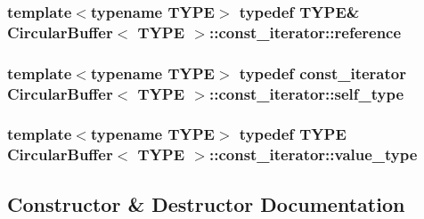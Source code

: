\subsubsection[{\texorpdfstring{reference}{reference}}]{\setlength{\rightskip}{0pt plus 5cm}template$<$typename T\+Y\+PE$>$ typedef T\+Y\+PE\& {\bf Circular\+Buffer}$<$ T\+Y\+PE $>$\+::{\bf const\+\_\+iterator\+::reference}}\hypertarget{classCircularBuffer_1_1const__iterator_a5e8717f5d13ea32a69b990ac7aa9d863}{}\label{classCircularBuffer_1_1const__iterator_a5e8717f5d13ea32a69b990ac7aa9d863}
\subsubsection[{\texorpdfstring{self\+\_\+type}{self_type}}]{\setlength{\rightskip}{0pt plus 5cm}template$<$typename T\+Y\+PE$>$ typedef {\bf const\+\_\+iterator} {\bf Circular\+Buffer}$<$ T\+Y\+PE $>$\+::{\bf const\+\_\+iterator\+::self\+\_\+type}}\hypertarget{classCircularBuffer_1_1const__iterator_a41a9fc607fc6af770334044799fdbe6b}{}\label{classCircularBuffer_1_1const__iterator_a41a9fc607fc6af770334044799fdbe6b}
\subsubsection[{\texorpdfstring{value\+\_\+type}{value_type}}]{\setlength{\rightskip}{0pt plus 5cm}template$<$typename T\+Y\+PE$>$ typedef T\+Y\+PE {\bf Circular\+Buffer}$<$ T\+Y\+PE $>$\+::{\bf const\+\_\+iterator\+::value\+\_\+type}}\hypertarget{classCircularBuffer_1_1const__iterator_a09a25d6aa06aafec6758f94ce15a86a6}{}\label{classCircularBuffer_1_1const__iterator_a09a25d6aa06aafec6758f94ce15a86a6}


\subsection{Constructor \& Destructor Documentation}
